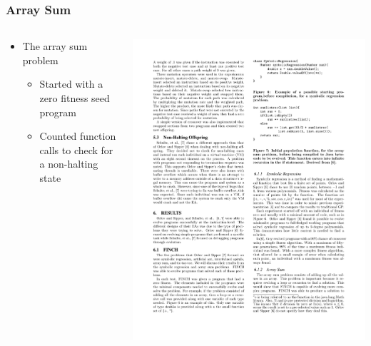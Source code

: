 \documentclass{beamer}
\begin{document}
\begin{frame}
\frametitle{Array Sum}
\begin{columns}
\begin{column}{0.5\textwidth}
\begin{itemize}
\item The array sum problem
\\
\begin{itemize}
\item Started with a zero fitness seed program
\item Counted function calls to check for a non-halting state
\end{itemize}

\end{itemize}
\end{column}
\begin{column}{0.5\textwidth}
\includegraphics[height=.38\textheight]{Illustrations/seedRec.pdf}
\end{column}
\end{columns}
\end{frame}
\end{document}
